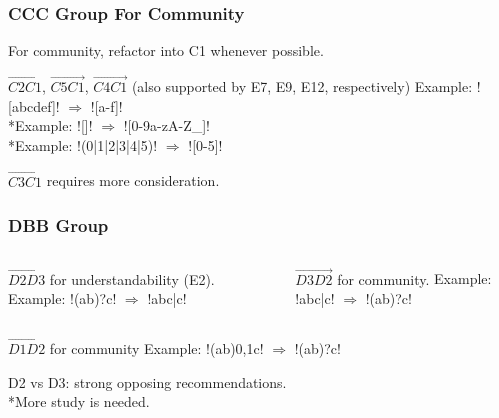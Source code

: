\begin{frame}[fragile]
\frametitle{CCC Group For Community}

\begin{center}
For community, refactor into C1 whenever possible.
\end{center}

\begin{block}{$\overrightarrow{C2 C1}$, $\overrightarrow{C5 C1}$, $\overrightarrow{C4 C1}$ (also supported by E7, E9, E12, respectively)}
Example: \cverb![abcdef]! $\Rightarrow$ \cverb![a-f]!
\\*Example: \cverb![\w]! $\Rightarrow$ \cverb![0-9a-zA-Z_]!
\\*Example: \cverb!(0|1|2|3|4|5)! $\Rightarrow$ \cverb![0-5]!
\end{block}
\begin{center}
$\overrightarrow{C3 C1}$ requires more consideration.
\end{center}

\end{frame}

\note[itemize]{
\item[CCC] -
}



\begin{frame}[fragile]
\frametitle{DBB Group}

\begin{columns}
\begin{block}{$\overrightarrow{D2 D3}$ for understandability (E2).}
Example: \cverb!(ab)?c! $\Rightarrow$ \cverb!abc|c!
\end{block}
\begin{block}{$\overrightarrow{D3 D2}$ for community.}
Example: \cverb!abc|c! $\Rightarrow$ \cverb!(ab)?c!
\end{block}
\end{columns}

\begin{block}{$\overrightarrow{D1 D2}$ for community}
Example: \cverb!(ab){0,1}c! $\Rightarrow$ \cverb!(ab)?c!
\end{block}

\begin{center}
D2 vs D3: strong opposing recommendations.
\\*More study is needed.
\end{center}

\end{frame}


